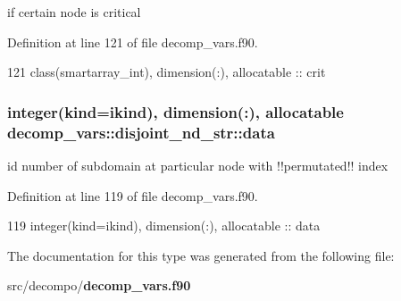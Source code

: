 if certain node is critical 



Definition at line 121 of file decomp\+\_\+vars.\+f90.


\begin{DoxyCode}
121     \textcolor{keywordtype}{class}(smartarray_int), \textcolor{keywordtype}{dimension(:)}, \textcolor{keywordtype}{allocatable} :: crit
\end{DoxyCode}
\subsubsection[{data}]{\setlength{\rightskip}{0pt plus 5cm}integer(kind=ikind), dimension(\+:), allocatable decomp\+\_\+vars\+::disjoint\+\_\+nd\+\_\+str\+::data}\label{structdecomp__vars_1_1disjoint__nd__str_a2637567c9804303673dc59dabc119722}


id number of subdomain at particular node with !!permutated!! index 



Definition at line 119 of file decomp\+\_\+vars.\+f90.


\begin{DoxyCode}
119     \textcolor{keywordtype}{integer(kind=ikind)}, \textcolor{keywordtype}{dimension(:)}, \textcolor{keywordtype}{allocatable} :: data
\end{DoxyCode}


The documentation for this type was generated from the following file\+:\begin{DoxyCompactItemize}
\item 
src/decompo/{\bf decomp\+\_\+vars.\+f90}\end{DoxyCompactItemize}
